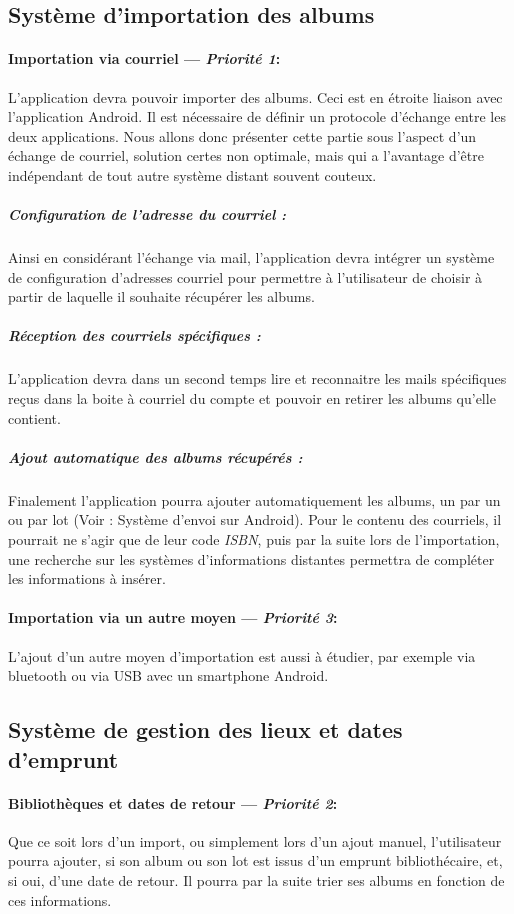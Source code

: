 \subsection{Système d'importation des albums}
\paragraph{Importation via courriel ---  \textit{Priorité 1}:}
L'application devra pouvoir importer des albums. 
Ceci est en étroite liaison avec l'application Android. Il est nécessaire de définir un protocole d'échange entre les deux applications. Nous allons donc présenter cette partie sous l'aspect d'un échange de courriel, solution certes non optimale, mais qui a l'avantage d'être indépendant de tout autre système distant souvent couteux.

\subparagraph{Configuration de l'adresse du courriel :}  
Ainsi en considérant l'échange via mail, l'application devra intégrer un système de configuration d'adresses courriel pour permettre à l'utilisateur de choisir à partir de laquelle il souhaite récupérer les albums.

\subparagraph{Réception des courriels spécifiques :}  
L'application devra dans un second temps lire et reconnaitre les mails spécifiques reçus dans la boite à courriel du compte et pouvoir en retirer les albums qu'elle contient.

\subparagraph{Ajout automatique des albums récupérés :}  
Finalement l'application pourra ajouter automatiquement les albums, un par un ou par lot (Voir : Système d'envoi sur Android). 
Pour le contenu des courriels, il pourrait ne s'agir que de leur code \emph{ISBN}, puis par la suite lors de l'importation, une recherche sur les systèmes d'informations distantes permettra de compléter les informations à insérer.
\paragraph{Importation via un autre moyen ---  \textit{Priorité 3}:}  
L'ajout d'un autre moyen d'importation est aussi à étudier, par exemple via bluetooth ou via USB avec un smartphone Android.

\subsection{Système de gestion des lieux et dates d'emprunt}
\paragraph{Bibliothèques et dates de retour ---  \textit{Priorité 2}:}
Que ce soit lors d'un import, ou simplement lors d'un ajout manuel, l'utilisateur pourra ajouter, si son album ou son lot est issus d'un emprunt bibliothécaire, et, si oui, d'une date de retour. 
Il pourra par la suite trier ses albums en fonction de ces informations.

